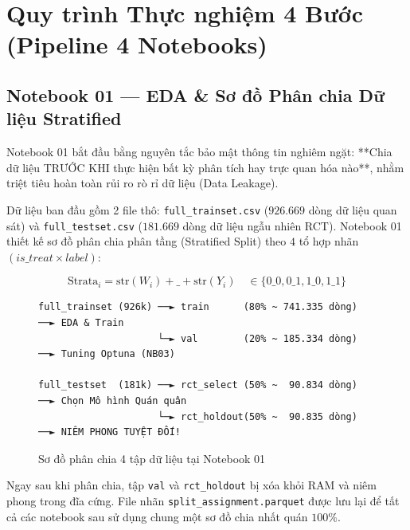 
\chapter{Quy trình Thực nghiệm 4 Bước (Pipeline 4 Notebooks)}

\section{Notebook 01 — EDA \& Sơ đồ Phân chia Dữ liệu Stratified}

Notebook 01 bắt đầu bằng nguyên tắc bảo mật thông tin nghiêm ngặt: **Chia dữ liệu TRƯỚC KHI thực hiện bất kỳ phân tích hay trực quan hóa nào**, nhằm triệt tiêu hoàn toàn rủi ro rò rỉ dữ liệu (Data Leakage).

Dữ liệu ban đầu gồm 2 file thô: \texttt{full\_trainset.csv} ($926.669$ dòng dữ liệu quan sát) và \texttt{full\_testset.csv} ($181.669$ dòng dữ liệu ngẫu nhiên RCT). Notebook 01 thiết kế sơ đồ phân chia phân tầng (Stratified Split) theo $4$ tổ hợp nhãn $(is\_treat \times label)$:

\begin{equation}
    \text{Strata}_i = \text{str}(W_i) + \text{\_} + \text{str}(Y_i) \quad \in \{0\_0, 0\_1, 1\_0, 1\_1\}
\end{equation}

\begin{figure}[h!]
\centering
\begin{mdframed}[linecolor=lazadablue,backgroundcolor=codebg,linewidth=1pt]
\begin{verbatim}
full_trainset (926k) ──► train      (80% ~ 741.335 dòng) ──► EDA & Train
                     └─► val        (20% ~ 185.334 dòng) ──► Tuning Optuna (NB03)

full_testset  (181k) ──► rct_select (50% ~  90.834 dòng) ──► Chọn Mô hình Quán quân
                     └─► rct_holdout(50% ~  90.835 dòng) ──► NIÊM PHONG TUYỆT ĐỐI!
\end{verbatim}
\end{mdframed}
\caption{Sơ đồ phân chia 4 tập dữ liệu tại Notebook 01}
\end{figure}

Ngay sau khi phân chia, tập \texttt{val} và \texttt{rct\_holdout} bị xóa khỏi RAM và niêm phong trong đĩa cứng. File nhãn \texttt{split\_assignment.parquet} được lưu lại để tất cả các notebook sau sử dụng chung một sơ đồ chia nhất quán $100\%$.

